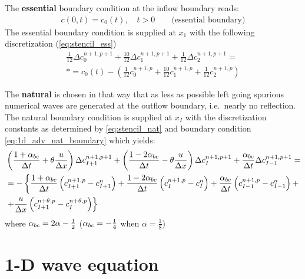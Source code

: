 The \textbf{essential} boundary condition at the inflow boundary reads:
\begin{align}
    c(0,t) = c_0(t), \quad t > 0 \qquad \text{(essential boundary)}
\end{align}
The essential boundary condition is supplied at $x_1$ with the following discretization (\autoref{eq:stencil_ess})
\begin{multline}
    \frac{1}{12} \Delta c^{n+1,p+1}_0 + \frac{10}{12} \Delta c^{n+1,p+1}_1 + \frac{1}{12}\Delta c^{n+1,p+1}_2 =
    \\*
    =c_0(t) - \left( \frac{1}{12} c^{n+1,p}_0 + \frac{10}{12} c^{n+1,p}_1 + \frac{1}{12} c^{n+1,p}_2 \right)
\end{multline}

The \textbf{natural} is chosen in that way that as less as possible left going spurious numerical waves are generated at the outflow boundary, i.e.\ nearly no reflection.
The natural boundary condition is supplied at $x_I$ with the discretization constants as determined by \autoref{eq:stencil_nat} and boundary condition \autoref{eq:1d_adv_nat_boundary} which yields:
\begin{align}
    &\left( \frac{1+\alpha_{bc}}{\Delta t} + \theta \frac{u}{\Delta x} \right) \Delta c^{n+1,p+1}_{I+1} +
     \left( \frac{1-2\alpha_{bc}}{\Delta t} - \theta \frac{u}{\Delta x} \right) \Delta c^{n+1,p+1}_I +
      \frac{\alpha_{bc}}{\Delta t}  \Delta c^{n+1,p+1}_{I-1}  =
    \\
    & = - \left\{
          \frac{1+\alpha_{bc}}{\Delta t} \left( c^{n+1,p}_{I+1} - c^n_{I+1} \right)
        + \frac{1-2\alpha_{bc}}{\Delta t} \left( c^{n+1,p}_{I} - c^n_{I} \right)
        + \frac{\alpha_{bc}}{\Delta t} \left( c^{n+1,p}_{I-1}- c^n_{I-1} \right) +
        \right. \\
    & \left. + \frac{u}{\Delta x} \left(c^{n+\theta,p}_{I+1} - c^{n+\theta,p}_{I} \right)
        \right\}
\end{align}
where $\alpha_{bc} = 2\alpha -\frac{1}{2}$ ($\alpha_{bc} = -\frac{1}{4}$ when $\alpha = \frac{1}{8}$)
\section{1-D wave equation}

